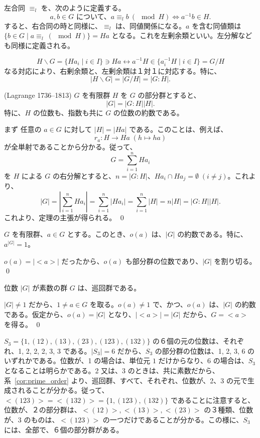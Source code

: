 \medskip
左合同 $\equiv_l$ を、次のように定義する。
$$a, b\in G \mbox{ について、}a\equiv_l b\:(\mod H) \Leftrightarrow a^{-1}b\in H.$$
すると、右合同の時と同様に、$\equiv_l$ は、同値関係になる。$a$ を含む同値類は $\{b\in G\mid a\equiv_l \:(\mod H)\} = Ha$  となる。これを左剰余類といい。左分解なども同様に定義される。

\medskip
$$H\backslash G = \{Ha_i\mid i\in I\}\ni Ha \leftrightarrow a^{-1}H\in \{a_i^{-1}H\mid i\in I\} = G/H$$
なる対応により、右剰余類と、左剰余類は１対１に対応する。特に、
$$|H\backslash G| = |G/H| = |G:H|.$$

\begin{thm} {\rm (Lagrange 1736--1813)}
$G$ を有限群 $H$ を $G$ の部分群とすると、
$$|G| = |G:H||H|.$$
特に、$H$ の位数も、指数も共に $G$ の位数の約数である。
\end{thm}
\proof
まず 任意の $a\in G$ に対して $|H| = |Ha|$ である。このことは、例えば、
$$r_a : H \to Ha \;(h\mapsto ha)$$
が全単射であることから分かる。従って、
$$G = \sum_{i=1}^n Ha_i$$
を $H$ による $G$ の右分解とすると、$n = |G:H|$、$Ha_i\cap Ha_j = \emptyset \;(i\neq j)$。これより、
$$|G| = \left|\sum_{i=1}^n Ha_i\right| = \sum_{i = 1}^n|Ha_i| = \sum_{i=1}^n |H| = n|H| = |G:H||H|.$$
これより、定理の主張が得られる。
\qed

\begin{cor} \label{cor:euler}
$G$ を有限群、$a\in G$ とする。このとき、$o(a)$ は、$|G|$ の約数である。特に、$a^{|G|} = 1$。
\end{cor}
\proof
$o(a) = |<a>|$ だったから、$o(a)$ も部分群の位数であり、$|G|$ を割り切る。
\qed

\begin{cor} \label{cor:prime_order}
位数 $|G|$ が素数の群 $G$ は、巡回群である。
\end{cor}
\proof
$|G|\neq 1$ だから、$1\neq a\in G$ を取る。$o(a)\neq 1$ で、かつ、$o(a)$ は、$|G|$ の約数である。仮定から、$o(a) = |G|$ となり、$|<a>| = |G|$ だから、$G = <a>$ を得る。
\qed

\begin{eg}
$S_3 = \{1, (12), (13), (23), (123), (132)\}$ の６個の元の位数は、それぞれ、1, 2, 2, 2, 3, 3 である。$|S_3| = 6$ だから、$S_3$ の部分群の位数は、1, 2, 3, 6 のいずれかである。位数が、1 の場合は、単位元 $1$ だけからなり、6 の場合は、$S_3$ となることは明らかである。2 又は、3  のときは、共に素数だから、系~\ref{cor:prime_order} より、巡回群、すべて、それぞれ、位数が、2、3 の元で生成されることが分かる。従って、$<(123)> = <(132)> = \{1,(123), (132)\}$  であることに注意すると、位数が、２の部分群は、$<(12)>, <(13)>, <(23)>$ の３種類、位数が、3 のものは、$<(123)>$ の一つだけであることが分かる。この様に、$S_3$ には、全部で、６個の部分群がある。
\end{eg}

